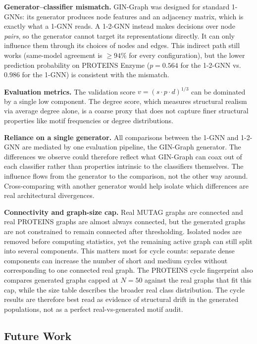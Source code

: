 \documentclass[12pt,a4paper]{article}
\begin{document}
\textbf{Generator--classifier mismatch.} GIN-Graph was designed for standard 1-GNNs: its generator produces node features and an adjacency matrix, which is exactly what a 1-GNN reads. A 1-2-GNN instead makes decisions over node \emph{pairs}, so the generator cannot target its representations directly. It can only influence them through its choices of nodes and edges. This indirect path still works (same-model agreement is $\geq 94\%$ for every configuration), but the lower prediction probability on PROTEINS Enzyme ($p = 0.564$ for the 1-2-GNN vs.\ $0.986$ for the 1-GNN) is consistent with the mismatch.

\textbf{Evaluation metrics.} The validation score $v = (s \cdot p \cdot d)^{1/3}$ can be dominated by a single low component. The degree score, which measures structural realism via average degree alone, is a coarse proxy that does not capture finer structural properties like motif frequencies or degree distributions.

\textbf{Reliance on a single generator.} All comparisons between the 1-GNN and 1-2-GNN are mediated by one evaluation pipeline, the GIN-Graph generator. The differences we observe could therefore reflect what GIN-Graph can coax out of each classifier rather than properties intrinsic to the classifiers themselves. The influence flows from the generator to the comparison, not the other way around. Cross-comparing with another generator would help isolate which differences are real architectural divergences.

\textbf{Connectivity and graph-size cap.} Real MUTAG graphs are connected and real PROTEINS graphs are almost always connected, but the generated graphs are not constrained to remain connected after thresholding. Isolated nodes are removed before computing statistics, yet the remaining active graph can still split into several components. This matters most for cycle counts: separate dense components can increase the number of short and medium cycles without corresponding to one connected real graph. The PROTEINS cycle fingerprint also compares generated graphs capped at $N=50$ against the real graphs that fit this cap, while the size table describes the broader real class distribution. The cycle results are therefore best read as evidence of structural drift in the generated populations, not as a perfect real-vs-generated motif audit.

\subsection{Future Work}
\end{document}
